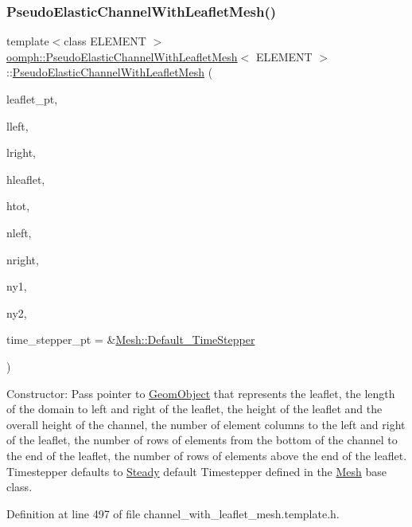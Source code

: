 \subsubsection{\texorpdfstring{Pseudo\+Elastic\+Channel\+With\+Leaflet\+Mesh()}{PseudoElasticChannelWithLeafletMesh()}}
{\footnotesize\ttfamily template$<$class E\+L\+E\+M\+E\+NT $>$ \\
\hyperlink{classoomph_1_1PseudoElasticChannelWithLeafletMesh}{oomph\+::\+Pseudo\+Elastic\+Channel\+With\+Leaflet\+Mesh}$<$ E\+L\+E\+M\+E\+NT $>$\+::\hyperlink{classoomph_1_1PseudoElasticChannelWithLeafletMesh}{Pseudo\+Elastic\+Channel\+With\+Leaflet\+Mesh} (\begin{DoxyParamCaption}\item[{\hyperlink{classoomph_1_1GeomObject}{Geom\+Object} $\ast$}]{leaflet\+\_\+pt,  }\item[{const double \&}]{lleft,  }\item[{const double \&}]{lright,  }\item[{const double \&}]{hleaflet,  }\item[{const double \&}]{htot,  }\item[{const unsigned \&}]{nleft,  }\item[{const unsigned \&}]{nright,  }\item[{const unsigned \&}]{ny1,  }\item[{const unsigned \&}]{ny2,  }\item[{\hyperlink{classoomph_1_1TimeStepper}{Time\+Stepper} $\ast$}]{time\+\_\+stepper\+\_\+pt = {\ttfamily \&\hyperlink{classoomph_1_1Mesh_a12243d0fee2b1fcee729ee5a4777ea10}{Mesh\+::\+Default\+\_\+\+Time\+Stepper}} }\end{DoxyParamCaption})\hspace{0.3cm}{\ttfamily [inline]}}



Constructor\+: Pass pointer to \hyperlink{classoomph_1_1GeomObject}{Geom\+Object} that represents the leaflet, the length of the domain to left and right of the leaflet, the height of the leaflet and the overall height of the channel, the number of element columns to the left and right of the leaflet, the number of rows of elements from the bottom of the channel to the end of the leaflet, the number of rows of elements above the end of the leaflet. Timestepper defaults to \hyperlink{classoomph_1_1Steady}{Steady} default Timestepper defined in the \hyperlink{classoomph_1_1Mesh}{Mesh} base class. 



Definition at line 497 of file channel\+\_\+with\+\_\+leaflet\+\_\+mesh.\+template.\+h.



